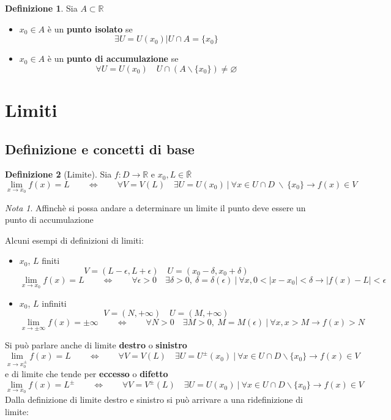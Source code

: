 \documentclass[]{report}
\theoremstyle{definition}
\newtheorem{defin}{Definizione}[chapter]
\theoremstyle{remark}
\newtheorem*{nota}{Nota}
\theoremstyle{plain}
\numberwithin{equation}{chapter}
\begin{document}
\begin{defin}\label{punti iso/acc}
	Sia $A \subset \mathbb{R} $
	\begin{itemize}
		\item 
	$x_{0} \in A$ \`{e} un \textbf{punto isolato} se
	$$\exists U=U(x_{0})|U \cap A=\{x_{0}\} $$
		\item 
	$x_{0} \in A$ \`{e} un \textbf{punto di accumulazione} se
	$$\forall U=U(x_{0})\quad U \cap (A \backslash \{x_{0}\} ) \neq \varnothing $$
	\end{itemize}
\end{defin}

\section{Limiti}

\subsection{Definizione e concetti di base}

\begin{defin}[Limite]\label{limite}
	Sia $f:D \rightarrow \mathbb{R}$ e $x_{0},L \in \bar{\mathbb{R}}$
	$$\lim_{x\to x_{0}} f(x)=L \qquad \Longleftrightarrow \qquad \forall V=V(L) \quad \exists U=U(x_{0}) \ | \ \forall x \in U \cap D \ \backslash \ \{x_{0}\} \rightarrow f(x) \in V$$
\end{defin}
\begin{nota}
	Affinch\`{e} si possa andare a determinare un limite il punto deve essere un punto di accumulazione
\end{nota}

Alcuni esempi di definizioni di limiti:
\begin{itemize}
	\item $x_{0}$, $L$ finiti
$$V=(L-\epsilon,L+\epsilon) \quad U=(x_{0}-\delta,x_{0}+\delta)$$	
$$\lim_{x\to x_{0}} f(x)=L \qquad \Longleftrightarrow \qquad \forall \epsilon > 0 \quad \exists \delta > 0 ,\ \delta = \delta (\epsilon ) \ | \ \forall x, 0<|x-x_{0}|<\delta \rightarrow |f(x)-L|<\epsilon$$
	\item $x_{0}$, $L$ infiniti
$$V=(N,+\infty) \quad U=(M,+\infty)$$	
$$\lim_{x\to \pm \infty} f(x)=\pm \infty \qquad \Longleftrightarrow \qquad \forall N > 0 \quad \exists M > 0 ,\ M = M (\epsilon ) \ | \ \forall x, x>M \rightarrow f(x)>N $$
\end{itemize}

Si  pu\`{o} parlare anche di limite \textbf{destro} o \textbf{sinistro}
$$\lim_{x\to x_{0}^\pm} f(x)=L \qquad \Longleftrightarrow \qquad \forall V=V(L) \quad \exists U=U^\pm(x_{0}) \ | \ \forall x \in U \cap D \backslash \{x_{0}\} \rightarrow f(x) \in V$$
e di limite che tende per \textbf{eccesso} o \textbf{difetto}
$$\lim_{x\to x_{0}} f(x)=L^\pm \qquad \Longleftrightarrow \qquad \forall V=V^\pm(L) \quad \exists U=U(x_{0}) \ | \ \forall x \in U \cap D \backslash \{x_{0}\} \rightarrow f(x) \in V$$
Dalla definizione di limite destro e sinistro si pu\`{o} arrivare a una ridefinizione di limite:
\end{document}
